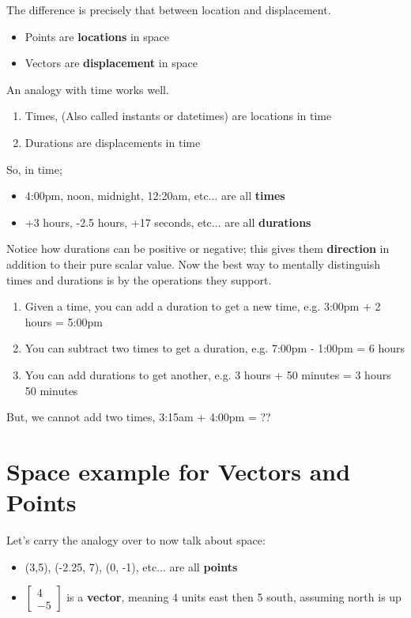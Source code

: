 \documentclass[12pt]{article}
\begin{document}
The difference is precisely that between location and displacement.

\begin{itemize}
    \item Points are \textbf{locations} in space
    \item Vectors are \textbf{displacement} in space
\end{itemize}

An analogy with time works well.

\begin{enumerate}
    \item Times, (Also called instants or datetimes) are locations in time
    \item Durations are displacements in time
\end{enumerate}

So, in time;


\begin{itemize}
    \item 4:00pm, noon, midnight, 12:20am, etc... are all \textbf{times}
    \item +3 hours, -2.5 hours, +17 seconds, etc... are all \textbf{durations}
\end{itemize}

Notice how durations can be positive or negative; this gives them \textbf{direction} in addition to their pure scalar value. Now the best way to mentally distinguish times and durations is by the operations they support.

\begin{enumerate}
    \item Given a time, you can add a duration to get a new time, e.g. 3:00pm + 2 hours = 5:00pm
    \item You can subtract two times to get a duration, e.g. 7:00pm - 1:00pm = 6 hours
    \item You can add durations to get another, e.g. 3 hours + 50 minutes = 3 hours 50 minutes
\end{enumerate}

But, we cannot add two times, 3:15am + 4:00pm = ??

\section{Space example for Vectors and Points}

Let's carry the analogy over to now talk about space:

\begin{itemize}
    \item (3,5), (-2.25, 7), (0, -1), etc... are all \textbf{points}
    \item $\begin{bmatrix} 4 \\ -5 \end{bmatrix}$ is a \textbf{vector}, meaning 4 units east then 5 south, assuming north is up
\end{itemize}
\end{document}
